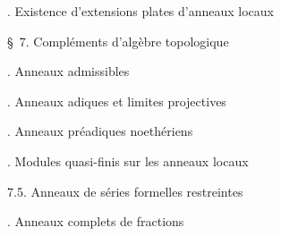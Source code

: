 \noindent{}. Existence d'extensions plates d'anneaux locaux\dotfill

\noindent\quad {}

\noindent\quad \S\ 7. Compléments d'algèbre topologique\dotfill

\noindent{}. Anneaux admissibles\dotfill

\noindent{}. Anneaux adiques et limites projectives\dotfill

\noindent{}. Anneaux préadiques noethériens\dotfill

\noindent{}. Modules quasi-finis sur les anneaux locaux\dotfill

\noindent\qquad {} 7.5. Anneaux de séries formelles restreintes\dotfill

\noindent{}. Anneaux complets de fractions\dotfill

